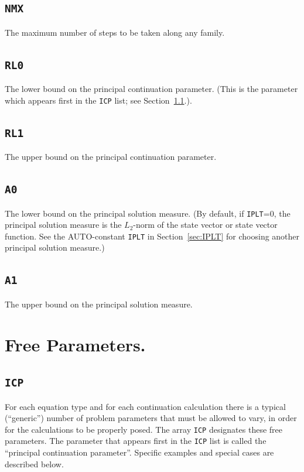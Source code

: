 \documentclass[12pt]{report}
\begin{document}
\subsection{\texttt{NMX}} \label{sec:NMX}
The maximum number of steps to be taken along any family.

\subsection{\texttt{RL0}}  \label{sec:RL0}
 The lower bound on the principal continuation parameter.
 (This is the parameter which appears first in the {\tt ICP} list;
 see Section~\ref{sec:ICP}.). 

\subsection{\texttt{RL1}}  \label{sec:RL1}
 The upper bound on the principal continuation parameter. 

\subsection{\texttt{A0}}  \label{sec:A0}
 The lower bound on the principal solution measure.
 (By default, if {\tt IPLT}=0, the principal solution measure
 is the $L_2$-norm of the state vector or state vector function.
 See the {\cal AUTO}-constant {\tt IPLT} in Section~\ref{sec:IPLT} 
 for choosing another principal solution measure.)

\subsection{\texttt{A1}}  \label{sec:A1}
 The upper bound on the principal solution measure.

\section{ Free Parameters.} \label{sec:Free_parameters}


\subsection{\texttt{ICP}}  \label{sec:ICP}
For each equation type and for each continuation calculation there is
a typical (``generic'') number of problem parameters that must be 
allowed to vary, in order for the calculations to be properly posed.
The array {\tt ICP} designates these free parameters.
The parameter that appears first in the {\tt ICP} list is called the 
``principal continuation parameter''.
Specific examples and special cases are described below.
\end{document}
